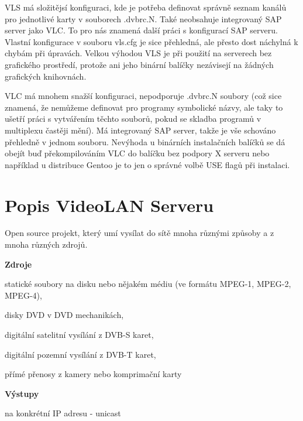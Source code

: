 \vspace{10pt}

VLS má složitějsí konfiguraci, kde je potřeba definovat správně seznam kanálů pro jednotlivé karty v souborech .dvbrc.N. Také neobsahuje integrovaný SAP server jako VLC. To pro nás znamená další práci s konfigurací SAP serveru. Vlastní konfigurace v souboru vls.cfg je sice přehledná, ale přesto dost náchylná k chybám při úpravách. Velkou výhodou VLS je při použití na serverech bez grafického prostředí, protože ani jeho binární balíčky nezávisejí na žádných grafických knihovnách.

\vspace{10pt}

VLC má mnohem snažší konfiguraci, nepodporuje .dvbrc.N soubory (což sice znamená, že nemůžeme definovat pro programy symbolické názvy, ale taky to ušetří práci s vytvářením těchto souborů, pokud se skladba programů v multiplexu častěji mění). Má integrovaný SAP server, takže je vše schováno přehledně v jednom souboru. Nevýhoda u binárních instalačních balíčků se dá obejít buď překompilováním VLC do balíčku bez podpory X serveru nebo například u distribuce Gentoo je to jen o správné volbě USE flagů při instalaci.

\section{Popis VideoLAN Serveru}

Open source projekt, který umí vysílat do sítě mnoha různými způsoby a z mnoha různých zdrojů.

\vspace{10pt}

\textbf{Zdroje}

\vspace{10pt}

statické soubory na disku nebo nějakém médiu (ve formátu MPEG-1, MPEG-2, MPEG-4),

disky DVD v DVD mechanikách,

digitální satelitní vysílání z DVB-S karet,

digitální pozemní vysílání z DVB-T karet,

přímé přenosy z kamery nebo komprimační karty

\vspace{10pt}

\textbf{Výstupy}

\vspace{10pt}

na konkrétní IP adresu - unicast

